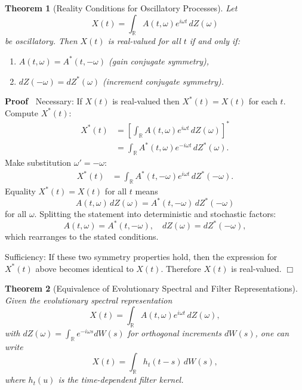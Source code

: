 \documentclass{article}
\newenvironment{proof}{\noindent\textbf{Proof\ }}{\hspace*{\fill}$\Box$\medskip}
\newtheorem{theorem}{Theorem}
\begin{document}
\begin{theorem}
  [Reality Conditions for Oscillatory Processes]
  Let
  \[
  X (t) = \int_{\mathbb{R}} A (t, \omega) e^{i \omega t} \, dZ (\omega)
  \]
  be oscillatory. Then $X(t)$ is real-valued for all $t$
  if and only if:
  \begin{enumerate}
    \item $A (t, \omega) = A^{\ast} (t, - \omega)$ (gain conjugate symmetry),
    \item $dZ (- \omega) = dZ^{\ast} (\omega)$ (increment conjugate symmetry).
  \end{enumerate}
\end{theorem}

\begin{proof}
Necessary:  
If $X(t)$ is real-valued then $X^*(t) = X(t)$ for each $t$. Compute $X^*(t)$:
\begin{align*}
X^*(t) &= \left[ \int_{\mathbb{R}} A(t,\omega) e^{i\omega t} \, dZ(\omega) \right]^* \\
&= \int_{\mathbb{R}} A^*(t,\omega) e^{-i\omega t} \, dZ^*(\omega).
\end{align*}
Make substitution $\omega' = -\omega$:
\begin{align*}
X^*(t) &= \int_{\mathbb{R}} A^*(t,-\omega) e^{i\omega t} \, dZ^*(-\omega).
\end{align*}
Equality $X^*(t) = X(t)$ for all $t$ means
\[
A(t,\omega) \, dZ(\omega) = A^*(t,-\omega) \, dZ^*(-\omega)
\]
for all $\omega$. Splitting the statement into deterministic and stochastic factors:
\[
A(t,\omega) = A^*(t,-\omega), \quad dZ(\omega) = dZ^*(-\omega),
\]
which rearranges to the stated conditions.

Sufficiency:  
If these two symmetry properties hold, then the expression for $X^*(t)$ above becomes identical to $X(t)$. Therefore $X(t)$ is real-valued.
\end{proof}

\begin{theorem}
  [Equivalence of Evolutionary Spectral and Filter Representations]
  Given the evolutionary spectral representation
  \[
  X(t) = \int_{\mathbb{R}} A(t,\omega) e^{i\omega t} \, dZ(\omega),
  \]
  with $dZ(\omega) = \int_{\mathbb{R}} e^{-i\omega s} dW(s)$ for orthogonal increments $dW(s)$,
  one can write
  \[
  X(t) = \int_{\mathbb{R}} h_t(t-s) \, dW(s),
  \]
  where $h_t(u)$ is the time-dependent filter kernel.
\end{theorem}
\end{document}
